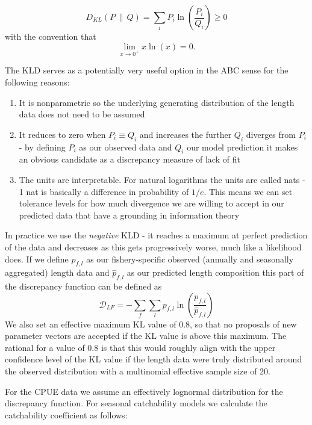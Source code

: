 \documentclass[12pt,a4paper,twoside,times,sky,standard]{csiroreport2017}
\newcommand{\wh}{\widehat}
\newcommand{\ds}{\displaystyle}
\begin{document}
\begin{equation*}
    \ds D_{KL}(P\,\parallel\,Q)=\sum\limits_i P_i\ln\left(\frac{P_i}{Q_i}\right)\geq 0
\end{equation*}
with the convention that
\begin{equation*}
    \ds \lim\limits_{x\rightarrow 0^+} x\ln(x) = 0.
\end{equation*}

The KLD serves as a potentially very useful option in the ABC sense for the following reasons:

\begin{enumerate}
    \item It is nonparametric so the underlying generating distribution of the length data does not need to be assumed
    \item It reduces to zero when $P_i\equiv Q_i$ and increases the further $Q_i$ diverges from $P_i$ - by defining $P_i$ as our observed data and $Q_i$ our model prediction it makes an obvious candidate as a discrepancy measure of lack of fit
    \item The units are interpretable. For natural logarithms the units are called nats - 1 nat is basically a difference in probability of $1/e$. This means we can set tolerance levels for how much divergence we are willing to accept in our predicted data that have a grounding in information theory
\end{enumerate}

In practice we use the \emph{negative} KLD - it reaches a maximum at perfect prediction of the data and decreases as this gets progressively worse, much like a likelihood does. If we define $p_{f,l}$ as our fishery-specific observed (annually and seasonally aggregated) length data and $\wh{p}_{f,l}$ as our predicted length composition this part of the discrepancy function can be defined as
\begin{equation*}
    \ds \mathcal{D}_{LF}=-\sum\limits_f\sum\limits_l p_{f,l}\ln\left(\frac{p_{f,l}}{\wh{p}_{f,l}}\right)
\end{equation*}
We also set an effective maximum KL value of 0.8, so that no proposals of new parameter vectors are accepted if the KL value is above this maximum. The rational for a value of 0.8 is that this would roughly align with the upper confidence level of the KL value if the length data were truly distributed around the observed distribution with a multinomial effective sample size of 20. 

For the CPUE data we assume an effectively lognormal distribution for the discrepancy function. For seasonal catchability models we calculate the catchability coefficient as follows:
\end{document}
